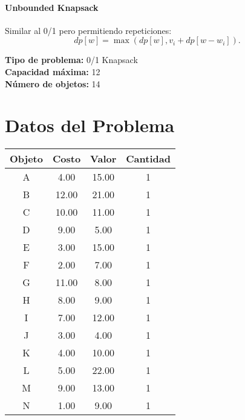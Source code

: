 \documentclass{article}
\begin{document}
\paragraph{Unbounded Knapsack} Similar al 0/1 pero permitiendo repeticiones:
\[
dp[w] = \max ( dp[w], v_i + dp[w - w_i] ).
\]

\thispagestyle{empty}
\newpage
\textbf{Tipo de problema:} 0/1 Knapsack\\
\textbf{Capacidad máxima:} 12\\
\textbf{Número de objetos:} 14\\

\section*{Datos del Problema}
\begin{tabular}{|c|c|c|c|}
\hline
Objeto & Costo & Valor & Cantidad \\
\hline
A & 4.00 & 15.00 & 1 \\
B & 12.00 & 21.00 & 1 \\
C & 10.00 & 11.00 & 1 \\
D & 9.00 & 5.00 & 1 \\
E & 3.00 & 15.00 & 1 \\
F & 2.00 & 7.00 & 1 \\
G & 11.00 & 8.00 & 1 \\
H & 8.00 & 9.00 & 1 \\
I & 7.00 & 12.00 & 1 \\
J & 3.00 & 4.00 & 1 \\
K & 4.00 & 10.00 & 1 \\
L & 5.00 & 22.00 & 1 \\
M & 9.00 & 13.00 & 1 \\
N & 1.00 & 9.00 & 1 \\
\hline
\end{tabular}
\end{document}
